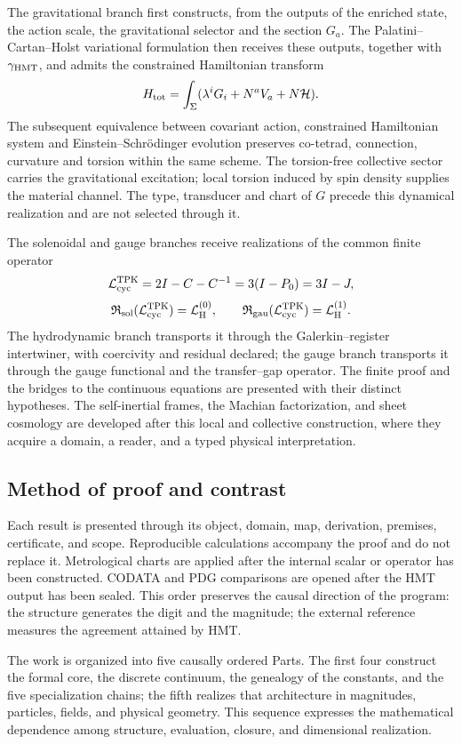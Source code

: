 The gravitational branch first constructs, from the outputs of the enriched
state, the action scale, the gravitational selector and the section
\(G_a\). The Palatini--Cartan--Holst variational formulation then receives
these outputs, together with \(\gamma_{\rm HMT}\), and admits the constrained
Hamiltonian transform
\[
 H_{\rm tot}=\int_\Sigma
 (\lambda^i G_i+N^a V_a+N\mathcal H).
\]
The subsequent equivalence between covariant action, constrained Hamiltonian system and
Einstein--Schrödinger evolution preserves co-tetrad, connection, curvature and
torsion within the same scheme. The torsion-free collective sector carries
the gravitational excitation; local torsion induced by spin density
supplies the material channel. The type, transducer and chart of \(G\) precede
this dynamical realization and are not selected through it.

The solenoidal and gauge branches receive realizations of the common finite operator
\[
 \mathcal L_{\rm cyc}^{\rm TPK}=2I-C-C^{-1}=3(I-P_0)=3I-J,
\]
\[
 \mathfrak R_{\rm sol}(\mathcal L_{\rm cyc}^{\rm TPK})
 =\mathcal L_{\rm H}^{(0)},\qquad
 \mathfrak R_{\rm gau}(\mathcal L_{\rm cyc}^{\rm TPK})
 =\mathcal L_{\rm H}^{(1)}.
\]
The hydrodynamic branch transports it through the Galerkin--register intertwiner, with coercivity and residual declared; the gauge branch transports it through the gauge functional and the transfer--gap operator. The finite proof and the bridges to the continuous equations are presented with their distinct hypotheses. The self-inertial frames, the Machian factorization, and sheet cosmology are developed after this local and collective construction, where they acquire a domain, a reader, and a typed physical interpretation.

\subsection*{Method of proof and contrast}

Each result is presented through its object, domain, map, derivation,
premises, certificate, and scope. Reproducible calculations accompany the
proof and do not replace it. Metrological charts are applied after
the internal scalar or operator has been constructed. CODATA and PDG comparisons
are opened after the HMT output has been sealed\@. This order preserves the
causal direction of the program: the structure generates the digit and the magnitude;
the external reference measures the agreement attained by HMT\@.

The work is organized into five causally ordered Parts. The first four
construct the formal core, the discrete continuum, the genealogy of the
constants, and the five specialization chains; the fifth realizes that architecture
in magnitudes, particles, fields, and physical geometry. This sequence expresses
the mathematical dependence among structure, evaluation, closure, and dimensional
realization.

